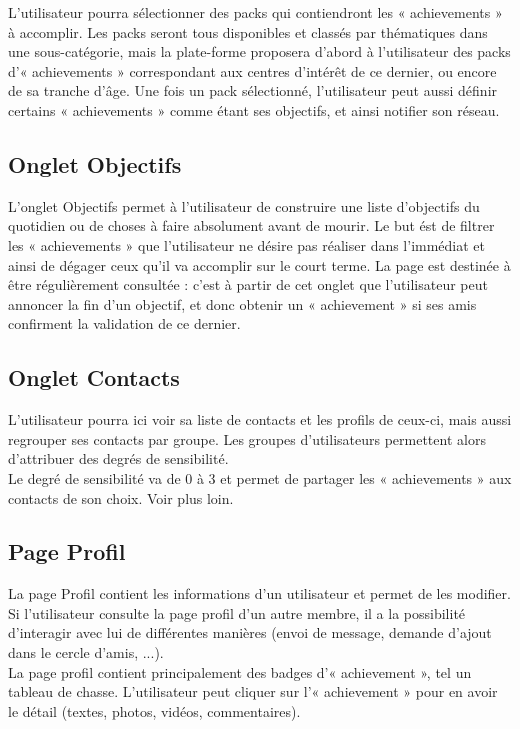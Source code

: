 \documentclass{life-fr}
\begin{document}
L'utilisateur pourra sélectionner des packs qui contiendront les « achievements » à accomplir. Les packs seront tous disponibles et classés par thématiques dans une sous-catégorie, mais la plate-forme proposera d'abord à l'utilisateur des packs d'« achievements » correspondant aux centres d'intérêt de ce dernier, ou encore de sa tranche d'âge. Une fois un pack sélectionné, l'utilisateur peut aussi définir certains « achievements » comme étant ses objectifs, et ainsi notifier son réseau.

\subsection{Onglet Objectifs}

L'onglet Objectifs permet à l'utilisateur de construire une liste d'objectifs du quotidien ou de choses à faire absolument avant de mourir. Le but ést de filtrer les « achievements » que l'utilisateur ne désire pas réaliser dans l'immédiat et ainsi de dégager ceux qu'il va accomplir sur le court terme. La page est destinée à être régulièrement consultée : c'est à partir de cet onglet que l'utilisateur peut annoncer la fin d'un objectif, et donc obtenir un « achievement » si ses amis confirment la validation de ce dernier.

\subsection{Onglet Contacts}

L'utilisateur pourra ici voir sa liste de contacts et les profils de ceux-ci, mais aussi regrouper ses contacts par groupe. Les groupes d'utilisateurs permettent alors d'attribuer des degrés de sensibilité.\\
Le degré de sensibilité va de 0 à 3 et permet de partager les « achievements » aux contacts de son choix. Voir plus loin.

\subsection{Page Profil}

La page Profil contient les informations d'un utilisateur et permet de les modifier. Si l'utilisateur consulte la page profil d'un autre membre, il a la possibilité d'interagir avec lui de différentes manières (envoi de message, demande d'ajout dans le cercle d'amis, ...).\\
La page profil contient principalement des badges d'« achievement », tel un tableau de chasse. L'utilisateur peut cliquer sur l'« achievement » pour en avoir le détail (textes, photos, vidéos, commentaires).
\end{document}
